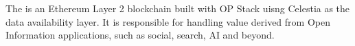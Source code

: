 \section{}
\label{sec:VSL}

The  is an Ethereum Layer 2 blockchain built with OP Stack uisng Celestia as the data availability layer. It is responsible for handling value derived from Open Information applications, such as social, search, AI and beyond.